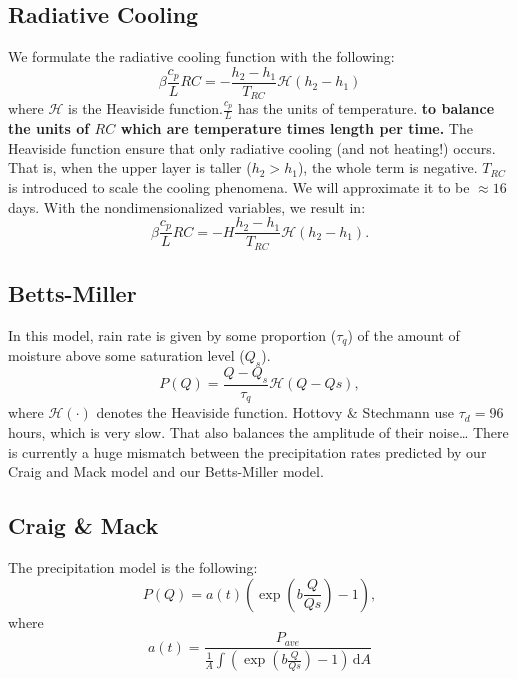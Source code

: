 \documentclass[10pt]{article}
\newcommand{\rmd}{\,\mathrm{d}}
\newcommand{\HH}{\mathcal{H}}
\begin{document}
\subsection{Radiative Cooling}

We formulate the radiative cooling function with the following:
\begin{equation}
\beta \frac{c_p}{L} RC = -\frac{h_2-h_1}{T_{RC}}\HH(h_2-h_1)
\end{equation}
where $\HH$ is the Heaviside function.{\color{blue}$\frac{c_p}{L}$ has the units of temperature.} {\bf to balance the units of $RC$ which are temperature times length per time.} The Heaviside function ensure that only radiative cooling (and not heating!) occurs. 
That is, when the upper layer  is taller ($h_2 > h_1$), the whole term is negative. 
$T_{RC}$ is introduced to scale the cooling phenomena. 
We will approximate it to be $\approx 16$ days. 
{\color{blue} With the nondimensionalized variables, we result in:
	\begin{equation}
	\beta \frac{c_p}{L} RC = -H\frac{h_2-h_1}{T_{RC}}\HH(h_2-h_1).
	\end{equation}
}

\subsection{Betts-Miller}
In this model, rain rate is given by some proportion ($\tau_q$) of the amount of moisture above some saturation level ($Q_s$).
\begin{equation*}
P(Q) = \frac{Q-Q_s}{\tau_q}\HH{(Q-Qs)},
\end{equation*}
where $\HH(\cdot)$ denotes the Heaviside function. 
Hottovy \& Stechmann use $\tau_d=96$ hours, which is very slow.
That also balances the amplitude of their noise\ldots
There is currently a huge mismatch between the precipitation rates predicted by our Craig and Mack model and our Betts-Miller model.

\subsection{Craig \& Mack \citep{CM2013}}
The precipitation model is the following:
\begin{equation}
P(Q) = a(t)\left(\exp(b\frac{Q}{Qs})-1\right),
\end{equation}
where 
\begin{equation}
a(t) = \frac{P_{ave}}{\frac{1}{A}\int \left( \exp(b\frac{Q}{Qs})-1 \right)\rmd A}
\end{equation}
\end{document}
